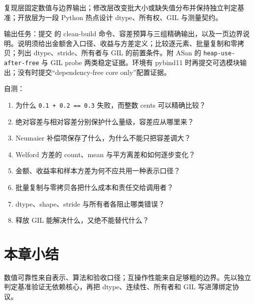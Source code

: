 复现层固定数值与边界输出；修改层改变批大小或缺失值分布并保持独立判定基准；开放层为一段 Python 热点设计 dtype、所有权、GIL 与测量契约。

输出任务：提交  的 clean-build 命令、容差预算与三组精确输出，以及一页边界说明。说明须给出金额舍入口径、收益与方差定义；比较逐元素、批量复制和零拷贝；列出 dtype、stride、所有者与 GIL 的前置条件。附 ASan 的 \texttt{heap-use-after-free} 与 GIL probe 两类稳定证据。环境有 pybind11 时再提交可选模块输出；没有时提交“dependency-free core only”配置证据。

自测：
\begin{enumerate}
  \item 为什么 \texttt{0.1 + 0.2 == 0.3} 失败，而整数 cents 可以精确比较？
  \item 绝对容差与相对容差分别保护什么量级，容差应从哪里来？
  \item Neumaier 补偿项保存了什么，为什么不能只把容差调大？
  \item Welford 方差的 count、mean 与平方离差和如何逐步变化？
  \item 金额、收益率和样本方差为何不应共用一种表示口径？
  \item 批量复制与零拷贝各把什么成本和责任交给调用者？
  \item dtype、shape、stride 与所有者各阻止哪类错误？
  \item 释放 GIL 能解决什么，又绝不能替代什么？
\end{enumerate}


\section{本章小结}

数值可靠性来自表示、算法和验收口径；互操作性能来自足够粗的边界。先以独立判定基准验证无依赖核心，再把 dtype、连续性、所有者和 GIL 写进薄绑定协议。
